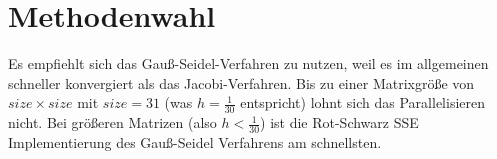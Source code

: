 \documentclass{article}
\begin{document}
\section{Methodenwahl}
Es empfiehlt sich das Gauß-Seidel-Verfahren zu nutzen, weil es im allgemeinen schneller konvergiert als das Jacobi-Verfahren. Bis zu einer Matrixgröße von $size \times size$ mit $size = 31$ (was $h=\frac{1}{30}$ entspricht) lohnt sich das Parallelisieren nicht. Bei größeren Matrizen (also $h < \frac{1}{30}$) ist die Rot-Schwarz SSE Implementierung des Gauß-Seidel Verfahrens am schnellsten.
\end{document}
